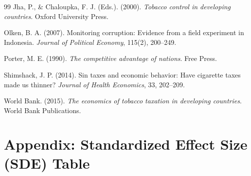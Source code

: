 \documentclass[12pt]{article}
\begin{document}
\begin{thebibliography}{99}
Jha, P., \& Chaloupka, F. J. (Eds.). (2000). \textit{Tobacco control in developing countries}. Oxford University Press.

Olken, B. A. (2007). Monitoring corruption: Evidence from a field experiment in Indonesia. \textit{Journal of Political Economy}, 115(2), 200--249.

Porter, M. E. (1990). \textit{The competitive advantage of nations}. Free Press.

Shimshack, J. P. (2014). Sin taxes and economic behavior: Have cigarette taxes made us thinner? \textit{Journal of Health Economics}, 33, 202--209.

World Bank. (2015). \textit{The economics of tobacco taxation in developing countries}. World Bank Publications.

\end{thebibliography}

\clearpage

\section*{Appendix: Standardized Effect Size (SDE) Table}


\end{document}
